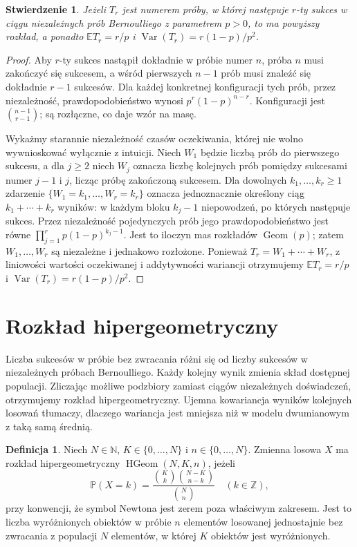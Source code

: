 \documentclass[11pt,a4paper,oneside]{report}
\numberwithin{equation}{chapter}
\theoremstyle{plain}
\newtheorem{stwierdzenie}[twierdzenie]{Stwierdzenie}
\theoremstyle{definition}
\newtheorem{definicja}{Definicja}[chapter]
\theoremstyle{remark}
\newcommand{\N}{\mathbb{N}}
\newcommand{\Z}{\mathbb{Z}}
\newcommand{\Prob}{\mathbb{P}}
\newcommand{\E}{\mathbb{E}}
\newcommand{\Var}{\operatorname{Var}}
\newcommand{\Geom}{\operatorname{Geom}}
\begin{document}
\begin{stwierdzenie}
Jeżeli $T_r$ jest numerem próby, w której następuje $r$-ty sukces
w ciągu niezależnych prób Bernoulliego z parametrem $p>0$,
to ma powyższy rozkład, a ponadto
$\E T_r=r/p$ i $\Var(T_r)=r(1-p)/p^2$.
\end{stwierdzenie}
\begin{proof}
Aby $r$-ty sukces nastąpił dokładnie w próbie numer $n$,
próba $n$ musi zakończyć się sukcesem, a wśród pierwszych
$n-1$ prób musi znaleźć się dokładnie $r-1$ sukcesów.
Dla każdej konkretnej konfiguracji tych prób, przez
niezależność, prawdopodobieństwo wynosi
$p^r(1-p)^{n-r}$. Konfiguracji jest
$\binom{n-1}{r-1}$; są rozłączne, co daje wzór na masę.

Wykażmy starannie niezależność czasów oczekiwania,
której nie wolno wywnioskować wyłącznie z intuicji.
Niech $W_1$ będzie liczbą prób do pierwszego sukcesu,
a dla $j\geq2$ niech $W_j$ oznacza liczbę kolejnych prób
pomiędzy sukcesami numer $j-1$ i $j$, licząc próbę
zakończoną sukcesem. Dla dowolnych $k_1,\ldots,k_r\geq1$
zdarzenie $\{W_1=k_1,\ldots,W_r=k_r\}$ oznacza
jednoznacznie określony ciąg
$k_1+\cdots+k_r$ wyników: w każdym bloku $k_j-1$
niepowodzeń, po których następuje sukces.
Przez niezależność pojedynczych prób jego
prawdopodobieństwo jest równe
$\prod_{j=1}^r p(1-p)^{k_j-1}$.
Jest to iloczyn mas rozkładów $\Geom(p)$;
zatem $W_1,\ldots,W_r$ są niezależne i jednakowo
rozłożone. Ponieważ $T_r=W_1+\cdots+W_r$,
z liniowości wartości oczekiwanej i addytywności
wariancji otrzymujemy
$\E T_r=r/p$ i $\Var(T_r)=r(1-p)/p^2$.
\end{proof}

\section{Rozkład hipergeometryczny}
Liczba sukcesów w próbie bez zwracania różni się od liczby
sukcesów w niezależnych próbach Bernoulliego. Każdy kolejny
wynik zmienia skład dostępnej populacji. Zliczając możliwe
podzbiory zamiast ciągów niezależnych doświadczeń, otrzymujemy
rozkład hipergeometryczny. Ujemna kowariancja wyników kolejnych
losowań tłumaczy, dlaczego wariancja jest mniejsza niż w modelu
dwumianowym z taką samą średnią.

\begin{definicja}
Niech $N\in\N$, $K\in\{0,\ldots,N\}$
i $n\in\{0,\ldots,N\}$.
Zmienna losowa $X$ ma rozkład hipergeometryczny
$\operatorname{HGeom}(N,K,n)$, jeżeli
\begin{equation}\label{eq:hypergeom}
\Prob(X=k)=\frac{\binom Kk\binom{N-K}{n-k}}{\binom Nn}
\quad(k\in\Z),
\end{equation}
przy konwencji, że symbol Newtona jest zerem poza właściwym zakresem.
Jest to liczba wyróżnionych obiektów w próbie $n$ elementów
losowanej jednostajnie bez zwracania z populacji $N$ elementów,
w której $K$ obiektów jest wyróżnionych.
\end{definicja}
\end{document}
